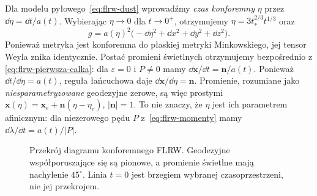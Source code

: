 \begin{przyklad}
\label{prz:flrw-konforemny}
Dla modelu pyłowego~\eqref{eq:flrw-dust} wprowadźmy
\emph{czas konforemny} $\eta$ przez $\dd\eta=\dd t/a(t)$.
Wybierając $\eta\to0$ dla $t\to0^+$, otrzymujemy
$\eta=3t_*^{2/3}t^{1/3}$ oraz
\begin{equation}\label{eq:flrw-konforemna}
 g=a(\eta)^2\bigl(-\dd\eta^2+\dd x^2+\dd y^2+\dd z^2\bigr).
\end{equation}
Ponieważ metryka jest konforemna do płaskiej metryki
Minkowskiego, jej tensor Weyla znika identycznie.
Postać promieni świetlnych otrzymujemy bezpośrednio z
\eqref{eq:flrw-pierwsza-calka}: dla $\varepsilon=0$ i $P\ne0$
mamy $\dd\mathbf x/\dd t=\mathbf n/a(t)$.
Ponieważ $\dd t/\dd\eta=a(t)$, reguła łańcuchowa daje
$\dd\mathbf x/\dd\eta=\mathbf n$.
Promienie, rozumiane jako \emph{niesparametryzowane}
geodezyjne zerowe, są więc prostymi
$\mathbf x(\eta)=\mathbf x_e+\mathbf n(\eta-\eta_e)$,
$|\mathbf n|=1$. To nie znaczy, że $\eta$ jest ich
parametrem afinicznym: dla niezerowego pędu $P$
z~\eqref{eq:flrw-momenty} mamy
$\dd\lambda/\dd t=a(t)/|P|$.

\begin{figure}[H]
\centering
{}
\caption{Przekrój diagramu konforemnego FLRW.
Geodezyjne współporuszające się są pionowe, a promienie świetlne
mają nachylenie $45^\circ$. Linia $t=0$ jest brzegiem
wybranej czasoprzestrzeni, nie jej przekrojem.}
\label{fig:flrw-konforemny}
\end{figure}
\end{przyklad}

